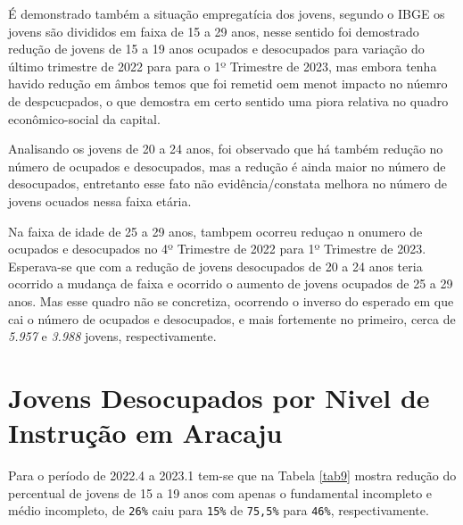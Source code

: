 É demonstrado também a situação empregatícia dos jovens, segundo o IBGE
\citep{ibge2023} os jovens são divididos em faixa de 15 a 29 anos, nesse
sentido foi demostrado redução de jovens de 15 a 19 anos ocupados e
desocupados para variação do último trimestre de 2022 para para o 1º
Trimestre de 2023, mas embora tenha havido redução em âmbos temos que
foi remetid oem menot impacto no núemro de despcucpados, o que demostra
em certo sentido uma piora relativa no quadro econômico-social da
capital.

Analisando os jovens de 20 a 24 anos, foi observado que há também
redução no número de ocupados e desocupados, mas a redução é ainda maior
no número de desocupados, entretanto esse fato não evidência/constata
melhora no número de jovens ocuados nessa faixa etária.

Na faixa de idade de 25 a 29 anos, tambpem ocorreu reduçao n onumero de
ocupados e desocupados no 4º Trimestre de 2022 para 1º Trimestre de
2023. Esperava-se que com a redução de jovens desocupados de 20 a 24
anos teria ocorrido a mudança de faixa e ocorrido o aumento de jovens
ocupados de 25 a 29 anos. Mas esse quadro não se concretiza, ocorrendo o
inverso do esperado em que cai o número de ocupados e desocupados, e
mais fortemente no primeiro, cerca de \emph{5.957} e \emph{3.988}
jovens, respectivamente.

\hypertarget{jovens-desocupados-por-nivel-de-instruuxe7uxe3o-em-aracaju}{%
\section{Jovens Desocupados por Nivel de Instrução em
Aracaju}\label{jovens-desocupados-por-nivel-de-instruuxe7uxe3o-em-aracaju}}

Para o período de 2022.4 a 2023.1 tem-se que na Tabela \ref{tab9} mostra
redução do percentual de jovens de 15 a 19 anos com apenas o fundamental
incompleto e médio incompleto, de \texttt{26\%} caiu para \texttt{15\%}
de \texttt{75,5\%} para \texttt{46\%}, respectivamente.

